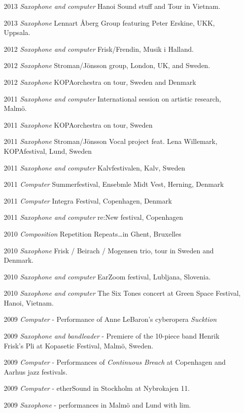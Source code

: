 \documentclass[a4paper]{article}
\begin{document}
\begin{enumerate}
\item [2013] \emph{Saxophone and computer} Hanoi Sound stuff and Tour in Vietnam.
\item [2013] \emph{Saxophone} Lennart \r{A}berg Group featuring Peter Erskine, UKK, Uppsala.
\item [2012] \emph{Soxophone and computer} Frisk/Frendin, Musik i Halland.
\item [2012] \emph{Soxophone} Stroman/J\"{o}nsson group, London, UK, and Sweden.
\item [2012] \emph{Saxophone} KOPAorchestra on tour, Sweden and Denmark
\item [2011] \emph{Saxophone and computer} International session on artistic research, Malm\"o.
\item [2011] \emph{Saxophone} KOPAorchestra on tour, Sweden
\item [2011] \emph{Saxophone} Stroman/J\"onsson Vocal project feat. Lena Willemark, KOPAfestival, Lund, Sweden
\item [2011] \emph{Saxophone and computer} Kalvfestivalen, Kalv, Sweden
\item [2011] \emph{Computer} Summerfestival, Ensebmle Midt Vest, Herning, Denmark
\item [2011] \emph{Computer} Integra Festival, Copenhagen, Denmark
\item [2011] \emph{Saxophone and computer} re:New festival, Copenhagen
\item [2010] \emph{Composition} Repetition Repeats\ldots in Ghent, Bruxelles
\item [2010] \emph{Saxophone} Frisk / Beirach / Mogensen trio, tour in Sweden and Denmark.
\item [2010] \emph{Saxophone and computer} EarZoom festival, Lubljana, Slovenia.
\item [2010] \emph{Saxophone and computer} The Six Tones concert at Green Space Festival, Hanoi, Vietnam.
\item [2009] \emph{Computer} - Performance of Anne LeBaron's cyberopera \emph{Sucktion}
\item [2009] \emph{Saxophone and bandleader} - Premiere of the 10-piece band Henrik Frisk's Pli at Kopasetic Festival, Malm\"o, Sweden.
\item [2009] \emph{Computer} - Performances of \emph{Continuous Breach} at Copenhagen and Aarhus jazz festivals.
\item [2009] \emph{Computer} - etherSound in Stockholm at Nybrokajen 11.
\item [2009] \emph{Saxophone} - performances in Malm\"o and Lund with lim.

\end{enumerate}
\end{document}
